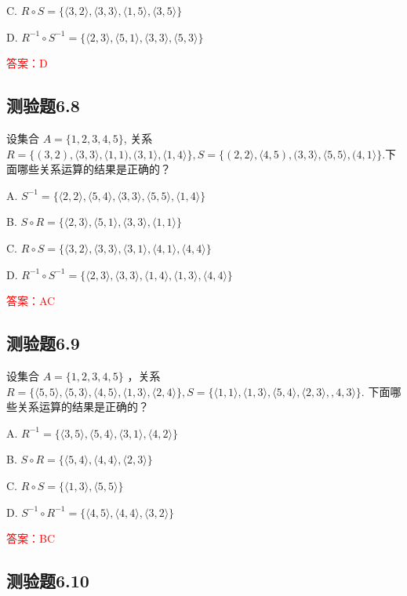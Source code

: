 \documentclass[UTF8, heading=true]{ctexart}
\begin{document}
C. $R \circ S=\{\langle 3,2\rangle,\langle 3,3\rangle,\langle 1,5\rangle,\langle 3,5\rangle\}$

D. 
$R^{-1} \circ S^{-1}=\{\langle 2,3\rangle,\langle 5,1\rangle,\langle 3,3\rangle,\langle 5,3\rangle\}$

\textcolor{red}{答案：D}


\subsection{测验题6.8}

设集合 $A=\{1,2,3,4,5\}$, 关系 $R=\{(3,2),\langle 3,3\rangle,\langle 1,1),(3,1\rangle,\langle 1,4\rangle\}, S=\{(2,2\rangle,\langle 4,5),(3,3\rangle,\langle 5,5\rangle,(4,1\rangle\}$.下面哪些关系运算的结果是正确的？

A. $S^{-1}=\{\langle 2,2\rangle,\langle 5,4\rangle,\langle 3,3\rangle,\langle 5,5\rangle,\langle 1,4\rangle\}$

B. ${S \circ R}=\{\langle 2,3\rangle,\langle 5,1\rangle,\langle 3,3\rangle,\langle 1,1\rangle\}$

C. ${R \circ S}=\{\langle 3,2\rangle,\langle 3,3\rangle,\langle 3,1\rangle,\langle 4,1\rangle,\langle 4,4\rangle\}$

D. $R^{-1} \circ S^{-1}=\{\langle 2,3\rangle,\langle 3,3\rangle,\langle 1,4\rangle,\langle 1,3\rangle,\langle 4,4\rangle\}$

\textcolor{red}{答案：AC}

\subsection{测验题6.9}

设集合 $A=\{1,2,3,4,5\}$ ，关系 $R=\{\langle 5,5\rangle,\langle 5,3\rangle,\langle 4,5\rangle,\langle 1,3\rangle,\langle 2,4\rangle\}, S=\{\langle 1,1\rangle,\langle 1,3\rangle,\langle 5,4\rangle,\langle 2,3\rangle,, 4,3\rangle\}$.
下面哪些关系运算的结果是正确的？

A. $ R^{-1}=\{\langle 3,5\rangle,\langle 5,4\rangle,\langle 3,1\rangle,\langle 4,2\rangle\} $

B. $S \circ R=\{\langle 5,4\rangle,\langle 4,4\rangle,\langle 2,3\rangle\} $

C. $ R \circ S=\{\langle 1,3\rangle,\langle 5,5\rangle\} $

D. $ S^{-1} \circ R^{-1}=\{\langle 4,5\rangle,\langle 4,4\rangle,\langle 3,2\rangle\}$

\textcolor{red}{答案：BC}


\subsection{测验题6.10}
\end{document}

